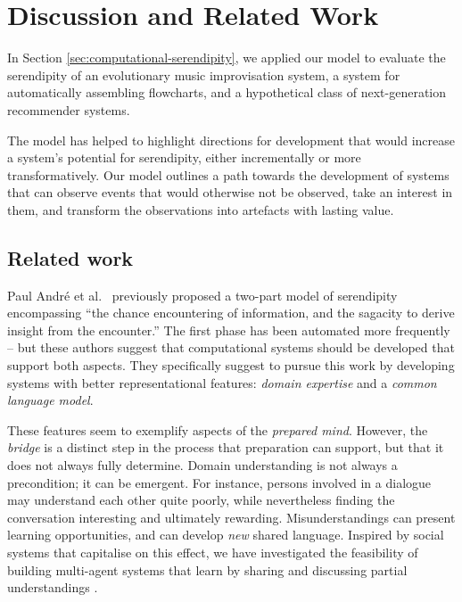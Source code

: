 \section{Discussion and Related Work} \label{sec:discussion}

In Section \ref{sec:computational-serendipity}, we applied our model
to evaluate the serendipity of an evolutionary music improvisation
system, a system for automatically assembling flowcharts, and
a hypothetical class of next-generation recommender systems.

The model has helped to highlight directions for development that
would increase a system's potential for serendipity, either
incrementally or more transformatively.  Our model outlines a path
towards the development of systems that can observe events that would
otherwise not be observed, take an interest in them, and transform the
observations into artefacts with lasting value.


%
%
%

%

\subsection{Related work} \label{sec:related}

Paul Andr{\'e} et al.~\citeyear{andre2009discovery} previously proposed a
two-part model of serendipity encompassing ``the chance encountering
of information, and the sagacity to derive insight from the
encounter.''  The first phase has been automated more frequently --
but these authors suggest that computational systems should be
developed that support both aspects.  They specifically suggest to
pursue this work by developing systems with better representational
features: \emph{domain expertise} and a \emph{common language model}.

These features seem to exemplify aspects of the \emph{prepared mind}.
However, the \emph{bridge} is a distinct step in the process that
preparation can support, but that it does not always fully determine.
Domain understanding is not always a precondition; it can be emergent.
For instance, persons involved in a dialogue may understand each other
quite poorly, while nevertheless finding the conversation interesting
and ultimately rewarding.  Misunderstandings can present learning
opportunities, and can develop \emph{new} shared language. %
Inspired by social systems that capitalise on this effect, we have investigated the feasibility
of building multi-agent systems that learn by sharing and discussing
partial understandings \cite{corneli2015computational,corneli2015feedback}.

